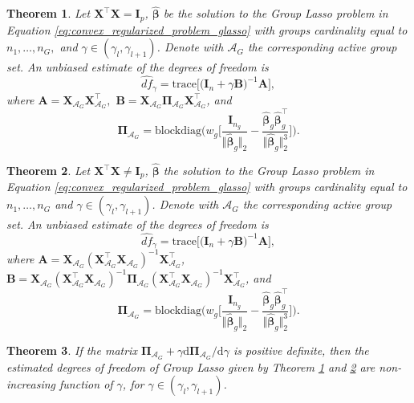 \documentclass[10pt,a4paper]{amsart}
\newtheorem{theorem}{Theorem}
\newcommand{\Aset}{\mathcal{A}}
\newcommand{\T}{\top}
\def\bA{\mathbf{A}}
\def\bB{\mathbf{B}}
\def\bI{\mathbf{I}}
\def\bPi{\boldsymbol{\Pi}}
\def\bX{\mathbf{X}}
\newcommand{\betahat}{\widehat{\boldsymbol\beta}}
\newcommand{\trace}{\mathrm{trace}}
\begin{document}
\begin{theorem}
\label{th:df_glasso_ortho}
Let $\bX^{\T}\bX=\bI_p$, $\betahat$ be the solution to the Group Lasso problem in Equation \eqref{eq:convex_regularized_problem_glasso} with groups cardinality equal to $n_1, \ldots, n_G,$ %
and $\gamma \in (\gamma_l, \gamma_{l+1})$. Denote with $\Aset_G$ the corresponding active group set. An unbiased estimate of the degrees of freedom is 
\begin{equation}
\label{eq:dof_glasso_ortho}
\widehat{df}_\gamma = \trace \big[ \big(\bI_n+\gamma \bB \big)^{-1} \bA  \big],
\end{equation} 
where $\bA = \bX_{\Aset_G}\bX_{\Aset_G}^{\T},$ $\bB = \bX_{\Aset_G}\bPi_{\Aset_G}\bX_{\Aset_G}^{\T}$, and 
\begin{equation}
\label{eq:ABPi_g_definition} 
\bPi_{\Aset_G} = \mathrm{blockdiag}\bigg(w_g\bigg[\frac{\bI_{n_g}}{\Vert\betahat_g\Vert_2}-\frac{\betahat_g\betahat_g^{\T}}{\Vert\betahat_g\Vert_2^3}\bigg]\bigg).
\end{equation}
\end{theorem}

\begin{theorem}
\label{th:df_glasso_nonortho} 
Let  $\bX^{\T}\bX \neq\bI_p$, $\betahat$ the solution to the Group Lasso problem in Equation \eqref{eq:convex_regularized_problem_glasso} with groups cardinality equal to $n_1, \ldots, n_G$ %
and $\gamma \in (\gamma_l, \gamma_{l+1})$. Denote with $\Aset_G$ the corresponding active group set. An unbiased estimate of the degrees of freedom is  
\begin{equation}
\label{eq:dof_glasso_nonortho}
\widehat{df}_\gamma = \trace \big[ \big(\bI_n+\gamma \bB\big)^{-1} \bA  \big],
\end{equation}
where $\bA = \bX_{\Aset_G}(\bX_{\Aset_G}^{\T}\bX_{\Aset_G})^{-1}\bX_{\Aset_G}^{\T}$,
$\bB = \bX_{\Aset_G}(\bX_{\Aset_G}^{\T}\bX_{\Aset_G})^{-1} \bPi_{\Aset_G} (\bX_{\Aset_G}^{\T}\bX_{\Aset_G})^{-1} \bX_{\Aset_G}^{\T}$,
and
\begin{equation*}
\bPi_{\Aset_G} = \mathrm{blockdiag}\bigg(w_g\bigg[\frac{\bI_{n_g}}{\Vert\betahat_g\Vert_2}-\frac{\betahat_g\betahat_g^{\T}}{\Vert\betahat_g\Vert_2^3}\bigg]\bigg).
\end{equation*}
\end{theorem}

\begin{theorem}
\label{th:monotonicity_df_glasso}
If the matrix $\bPi_{\Aset_G} + \gamma \mathrm{d} \bPi_{\Aset_G} / \mathrm{d}\gamma $ is positive definite, then the estimated degrees of freedom of Group Lasso given by Theorem \ref{th:df_glasso_ortho} and \ref{th:df_glasso_nonortho} are non-increasing function of $\gamma$, for $\gamma \in (\gamma_l, \gamma_{l+1})$.
\end{theorem}
\end{document}
